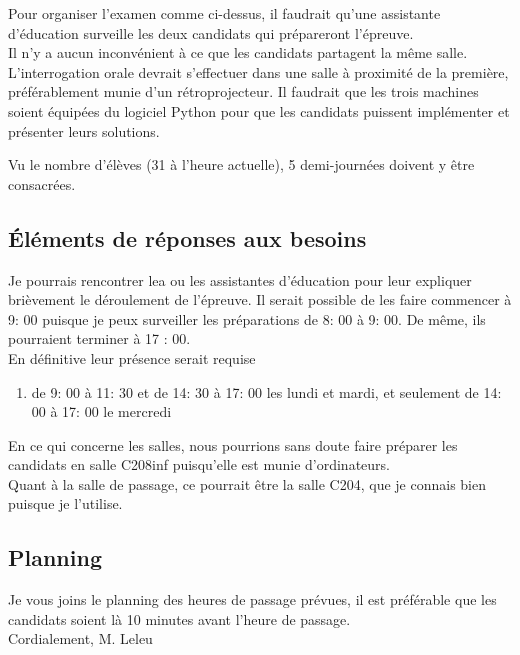 \documentclass[a4paper,12pt,french]{book}
\begin{document}
Pour organiser l'examen comme ci-dessus, il faudrait qu'un\cdot e assistant\cdot e d'éducation surveille les deux candidats qui prépareront l'épreuve.\\
Il n'y a aucun inconvénient à ce que les candidats partagent la même salle. L'interrogation orale devrait s'effectuer dans une salle à proximité de la première, préférablement munie d'un rétroprojecteur.
Il faudrait que les trois machines soient équipées du logiciel Python pour que les candidats puissent implémenter et présenter leurs solutions.


Vu le nombre d'élèves (31 à l'heure actuelle), 5 demi-journées doivent y être consacrées.

\subsection*{\'Eléments de réponses aux besoins}

Je pourrais rencontrer le\cdot a ou les assistant\cdot e\cdot s d'éducation pour leur expliquer brièvement le déroulement de l'épreuve. Il serait possible de les faire commencer à 9: 00 puisque je peux surveiller les préparations de 8: 00 à 9: 00. De même, ils pourraient terminer à 17 : 00.\\
En définitive leur présence serait requise 
\begin{enumerate}[--]
	\item de 9: 00 à 11: 30 et de 14: 30 à 17: 00 les lundi et mardi, et seulement de 14: 00 à 17: 00 le mercredi
\end{enumerate}

En ce qui concerne les salles, nous pourrions sans doute faire préparer les candidats en salle C208inf puisqu'elle est munie d'ordinateurs.\\

Quant à la salle de passage, ce pourrait être la salle C204, que je connais bien puisque je l'utilise.\\

\subsection*{Planning}

Je vous joins le planning des heures de passage prévues, il est préférable que les candidats soient là 10 minutes avant l'heure de passage.\\[3em]

Cordialement,
M. Leleu
\end{document}
